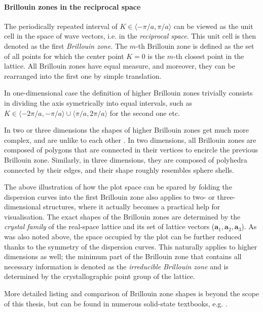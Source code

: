 \paragraph{Brillouin zones in the reciprocal space} %
The periodically repeated interval of $K\in\langle-\pi/a, \pi/a\rangle$ can be viewed as the unit cell in the space of wave vectors, i.e. in the \textit{reciprocal space}. This unit cell is then denoted as the first \textit{Brillouin zone}. 
The $m$-th Brillouin zone is defined as the set of all points for which the center point $K=0$ is the $m$-th closest point in the lattice. 
All Brillouin zones have equal measure, and moreover, they can be rearranged into the first one by simple translation. 

In one-dimensional case the definition of higher Brillouin zones trivially consists in dividing the axis symetrically into equal intervals, such as $K\in\langle-2\pi/a, -\pi/a\rangle \cup \langle \pi/a, 2\pi/a\rangle$ for the second one etc. 

In two or three dimensions the shapes of higher Brillouin zones get much more complex, and are unlike to each other \cite[pp. 134--135]{klingshirn2007semiconductor}. 
In two dimensions, all Brillouin zones are composed of polygons that are connected in their vertices to encircle the previous Brillouin zone. Similarly, in three dimensions, they are composed of polyhedra connected by their edges, and their shape roughly resembles sphere shells. 

The above illustration of how the plot space can be spared by folding the dispersion curves into the first Brillouin zone also applies to two- or three-dimensional structures, where it actually becomes a practical help for visualisation.
The exact shapes of the Brillouin zones are determined by the \textit{crystal family} of the real-space lattice and its set of lattice vectors ($\mathbf{a}_1, \mathbf{a}_2, \mathbf{a}_3$). 
As was also noted above, the space occupied by the plot can be further reduced thanks to the symmetry of the dispersion curves. This naturally applies to higher dimensions as well; the minimum part of the Brillouin zone that contains all necessary information is denoted as the \textit{irreducible Brillouin zone} and is determined by the crystallographic point group of the lattice. 

More detailed listing and comparison of Brillouin zone shapes is beyond the scope of this thesis, but can be found in numerous solid-state textbooks, e.g. \cite[pp. 96-99]{klingshirn2007semiconductor}. %


